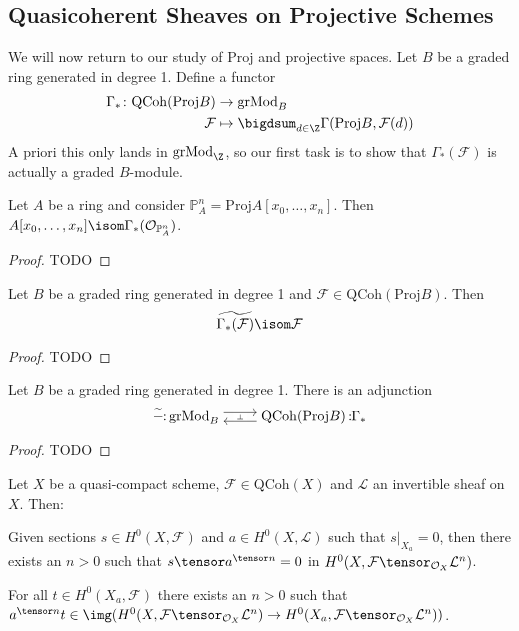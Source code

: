 \documentclass[wip, algebra]{bsteffan-lecturenotes}
\newcommand{\cO}{\mathcal{O}}
\newcommand{\cF}{\mathcal{F}}
\newcommand{\cL}{\mathcal{L}}
\renewcommand{\P}{\mathbb{P}}
\newcommand{\Proj}{\mathrm{Proj}}
\newcommand{\QCoh}{\mathrm{QCoh}}
\newcommand{\grMod}{\mathrm{grMod}}
\newcommand*\noloc{%
        \nobreak
        \mskip6mu plus1mu
        \mathpunct{}%
        \nonscript
        \mkern-\thinmuskip
        {:}%
        \mskip2mu
        \relax
}
\begin{document}
\subsection{Quasicoherent Sheaves on Projective Schemes}
We will now return to our study of $\Proj$ and projective spaces.
Let $B$ be a graded ring generated in degree 1.
Define a functor
\begin{align*}
	\Gamma_*\colon \QCoh(\Proj B) &\to \grMod_B \\
	\cF &\mapsto \bigdsum_{d \in \Z} \Gamma(\Proj B, \cF(d))
\end{align*}
A priori this only lands in $\grMod_\Z$, so our first task is to show that $\Gamma_*(\cF)$ is actually a graded $B$-module.
\begin{proposition}
	Let $A$ be a ring and consider $\P^n_A = \Proj A[x_0, \ldots, x_n]$.
	Then $A[x_0, \ldots, x_n] \isom \Gamma_*(\cO_{\P^n_A})$.
\end{proposition}
\begin{proof}
	TODO
\end{proof}
\begin{proposition}
	Let $B$ be a graded ring generated in degree 1 and $\cF \in \QCoh(\Proj B)$.
	Then 
	\begin{equation*}
		\widetilde{\Gamma_*(\cF)} \isom \cF
	\end{equation*}
\end{proposition}
\begin{proof}
	TODO
\end{proof}
\begin{proposition}
	Let $B$ be a graded ring generated in degree 1.
	There is an adjunction
	\begin{equation*}
		\begin{tikzcd}[cramped]
			\widetilde{{-}}\!\colon\! \grMod_B
					\ar[r, phantom, "\scriptscriptstyle\bot" description]
					\ar[r, shift left = 0.75ex]
				& \QCoh(\Proj B)\!\noloc\! \Gamma_*
					\ar[l, shift left = 0.75ex]
		\end{tikzcd}
	\end{equation*}
\end{proposition}
\begin{proof}
	TODO
\end{proof}
\begin{proposition}
	Let $X$ be a quasi-compact scheme, $\cF \in \QCoh(X)$ and $\cL$ an invertible sheaf on $X$.
	Then:
	\begin{alphanumerate}
		\item Given sections $s \in H^0(X, \cF)$ and $a \in H^0(X, \cL)$ such that $s|_{X_a} = 0$, then there exists an $n > 0$ such that $s \tensor a^{\tensor n} = 0$ in $H^0(X, \cF \tensor_{\cO_X} \cL^n)$.
		\item For all $t \in H^0(X_a, \cF)$ there exists an $n > 0$ such that $a^{\tensor n} t \in \img(H^0(X, \cF \tensor_{\cO_X} \cL^n) \to H^0(X_a, \cF \tensor_{\cO_X} \cL^n))$.
	\end{alphanumerate}
\end{proposition}
\end{document}
